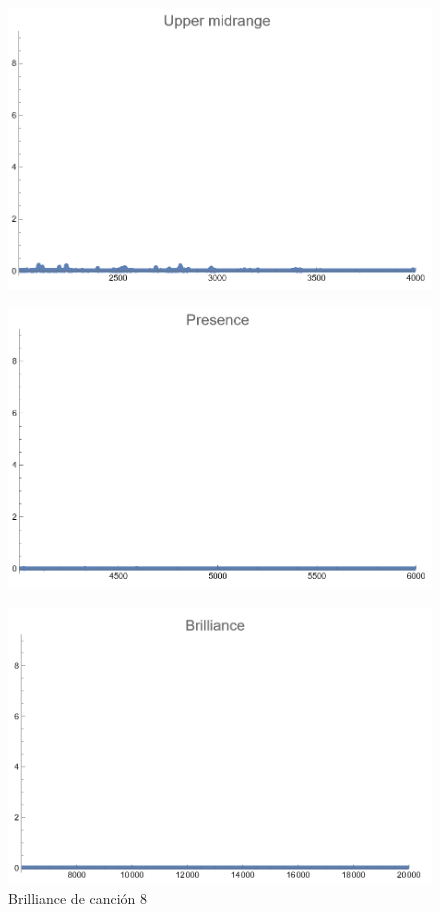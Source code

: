 \documentclass[12pt, letterpaper]{article}
\begin{document}
\begin{figure}[H]
  \centering
  \begin{minipage}{.5\textwidth}
    \centering
    \includegraphics[width=.9\linewidth]{imgs/Cancion8/upmid.png}
    \label{fig:08f}
  \end{minipage}%
  \begin{minipage}{.5\textwidth}
    \centering
    \includegraphics[width=.9\linewidth]{imgs/Cancion8/presence.png}
    \label{fig:08g}
  \end{minipage}
\end{figure}
\begin{figure}[H]
  \centering
  \includegraphics[width=.45\linewidth]{imgs/Cancion8/brilliance.png}
  \caption{Brilliance de canción 8}
  \label{fig:08h}
\end{figure}
\end{document}
